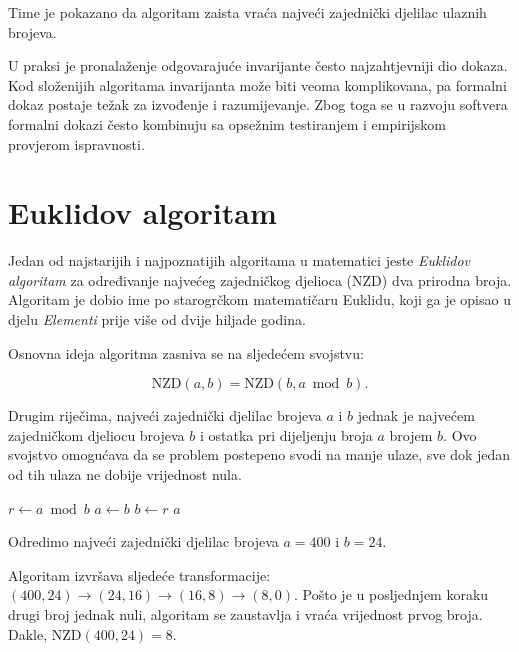 Time je pokazano da algoritam zaista vraća najveći zajednički djelilac ulaznih brojeva.


U praksi je pronalaženje odgovarajuće invarijante često najzahtjevniji dio dokaza. Kod složenijih algoritama invarijanta može biti veoma komplikovana, pa formalni dokaz postaje težak za izvođenje i razumijevanje. Zbog toga se u razvoju softvera formalni dokazi često kombinuju sa opsežnim testiranjem i empirijskom provjerom ispravnosti.

\section{Euklidov algoritam}

Jedan od najstarijih i najpoznatijih algoritama u matematici jeste \textit{Euklidov algoritam} za određivanje najvećeg zajedničkog djelioca (NZD) dva prirodna broja. Algoritam je dobio ime po starogrčkom matematičaru Euklidu, koji ga je opisao u djelu \textit{Elementi} prije više od dvije hiljade godina.

Osnovna ideja algoritma zasniva se na sljedećem svojstvu:

$$\text{NZD}(a,b)=\text{NZD}(b,a\bmod b).$$

Drugim riječima, najveći zajednički djelilac brojeva $a$ i $b$ jednak je najvećem zajedničkom djeliocu brojeva $b$ i ostatka pri dijeljenju broja $a$ brojem $b$. Ovo svojstvo omogućava da se problem postepeno svodi na manje ulaze, sve dok jedan od tih ulaza ne dobije vrijednost nula.

\begin{algorithm}[H]
	\begin{algorithmic}[1]
		\State $r \gets a \bmod b$
		\State $a \gets b$
		\State $b \gets r$
		\EndWhile
		\State \Return $a$
		\EndProcedure
	\end{algorithmic}
	\caption{Euklidov algoritam.}
	\label{alg:nzd-euclid}
\end{algorithm}

\begin{example}
	
	Odredimo najveći zajednički djelilac brojeva 	$
	a=400$ i $b=24.$ 
\end{example}
	
	\begin{solution}
	Algoritam izvršava sljedeće transformacije: 	$
	(400,24)
	\rightarrow
	(24,16)
	\rightarrow
	(16,8)
	\rightarrow
	(8,0).
	$	Pošto je u posljednjem koraku drugi broj jednak nuli, algoritam se zaustavlja i vraća vrijednost prvog broja. Dakle, $\text{NZD}(400,24)=8.$
\end{solution}


